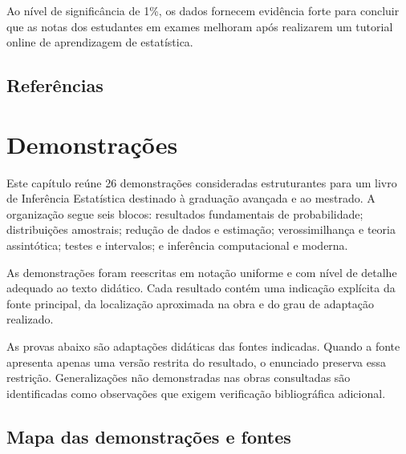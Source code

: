 \documentclass[
  letterpaper,
  DIV=11,
  numbers=noendperiod]{scrreprt}
\begin{document}
Ao nível de significância de 1\%, os dados fornecem evidência forte para
concluir que as notas dos estudantes em exames melhoram após realizarem
um tutorial online de aprendizagem de estatística.

\section{Referências}\label{referuxeancias-6}


\chapter{Demonstrações}\label{demonstrauxe7uxf5es}

Este capítulo reúne 26 demonstrações consideradas estruturantes para um
livro de Inferência Estatística destinado à graduação avançada e ao
mestrado. A organização segue seis blocos: resultados fundamentais de
probabilidade; distribuições amostrais; redução de dados e estimação;
verossimilhança e teoria assintótica; testes e intervalos; e inferência
computacional e moderna.

As demonstrações foram reescritas em notação uniforme e com nível de
detalhe adequado ao texto didático. Cada resultado contém uma indicação
explícita da fonte principal, da localização aproximada na obra e do
grau de adaptação realizado.

\begin{tcolorbox}[enhanced jigsaw, colback=white, leftrule=.75mm, colbacktitle=quarto-callout-warning-color!10!white, breakable, titlerule=0mm, bottomtitle=1mm, title=\textcolor{quarto-callout-warning-color}{\faExclamationTriangle}\hspace{0.5em}{Escopo bibliográfico}, colframe=quarto-callout-warning-color-frame, toprule=.15mm, opacityback=0, bottomrule=.15mm, opacitybacktitle=0.6, arc=.35mm, toptitle=1mm, rightrule=.15mm, coltitle=black, left=2mm]

As provas abaixo são adaptações didáticas das fontes indicadas. Quando a
fonte apresenta apenas uma versão restrita do resultado, o enunciado
preserva essa restrição. Generalizações não demonstradas nas obras
consultadas são identificadas como observações que exigem verificação
bibliográfica adicional.

\end{tcolorbox}

\section*{Mapa das demonstrações e
fontes}\label{mapa-das-demonstrauxe7uxf5es-e-fontes}
\end{document}

